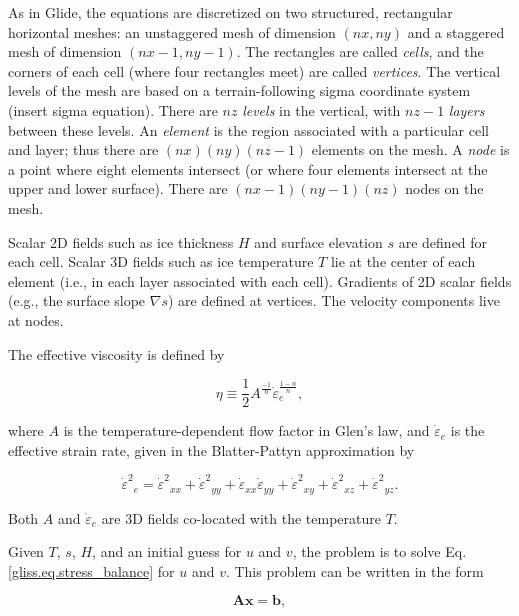 As in Glide, the equations are discretized on two structured, rectangular horizontal meshes: an unstaggered mesh
of dimension $(nx,ny)$ and a staggered mesh of dimension $(nx-1,ny-1)$.  The rectangles
are called \textit{cells}, and the corners of each cell (where four rectangles meet) are called \textit{vertices}.
The vertical levels of the mesh are based on a terrain-following sigma coordinate system (insert sigma equation).
There are $nz$ \textit{levels} in the vertical, with $nz-1$ \textit{layers} between these levels.
An \textit{element} is the region associated with a particular cell and layer; thus there are
$(nx)(ny)(nz-1)$ elements on the mesh.  A \textit{node} is a point where eight elements intersect (or where four elements
intersect at the upper and lower surface). There are $(nx-1)(ny-1)(nz)$ nodes on the mesh.

Scalar 2D fields such as ice thickness $H$ and surface elevation $s$ are defined for each cell.
Scalar 3D fields such as ice temperature $T$ lie at the center of each element (i.e., in each layer
associated with each cell). Gradients of 2D scalar fields (e.g., the surface slope $\nabla s$) are defined at vertices.
The velocity components live at nodes.

The effective viscosity is defined by

\begin{equation}
  \eta \equiv \frac{1}{2} A^{\frac{-1}{n}} \dot{\varepsilon }_{e}^{\frac{1-n}{n}},
\end{equation}

\noindent
where $A$ is the temperature-dependent flow factor in Glen's law, and $\dot{\varepsilon }_{e}$ is the effective strain rate,
given in the Blatter-Pattyn approximation by 

\begin{equation}
{{\dot{\varepsilon }}^{2}}_{e}={{\dot{\varepsilon }}^{2}}_{xx}+{{\dot{\varepsilon }}^{2}}_{yy}+{{\dot{\varepsilon }}_{xx}}{{\dot{\varepsilon }}_{yy}}+{{\dot{\varepsilon }}^{2}}_{xy}+{{\dot{\varepsilon }}^{2}}_{xz}+{{\dot{\varepsilon }}^{2}}_{yz}.
\end{equation}

\noindent
Both $A$ and $\dot{\varepsilon }_{e}$ are 3D fields co-located with the temperature $T$.

Given $T$, $s$, $H$, and an initial guess for $u$ and $v$, the problem is to solve Eq. \eqref{gliss.eq.stress_balance}
for $u$ and $v$.  This problem can be written in the form

\begin{equation}
  \mathbf{A} \mathbf{x} = \mathbf{b},
\end{equation}

